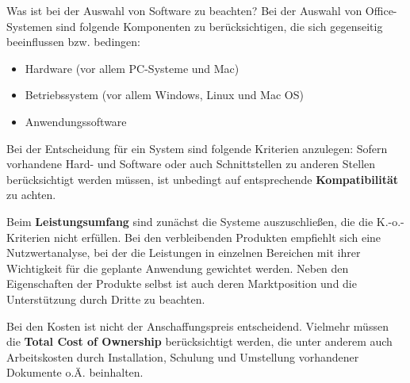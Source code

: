 \documentclass[a6paper,10pt,grid=front%
,toc
]{kartei}
\begin{document}
  \begin{karte}{Was ist bei der Auswahl von Software zu beachten?}  
    Bei der Auswahl von Office-Systemen sind folgende Komponenten zu berücksichtigen, die sich gegenseitig beeinflussen bzw. bedingen:

    \begin{itemize}
      \item Hardware (vor allem PC-Systeme und Mac)
      \item Betriebssystem (vor allem Windows, Linux und Mac OS)
      \item Anwendungssoftware
    \end{itemize}

    Bei der Entscheidung für ein System sind folgende Kriterien anzulegen: Sofern vorhandene Hard- und Software oder auch Schnittstellen zu anderen Stellen berücksichtigt werden müssen, ist unbedingt auf entsprechende \textbf{Kompatibilität} zu achten.

    Beim \textbf{Leistungsumfang} sind zunächst die Systeme auszuschließen, die die K.-o.-Kriterien nicht erfüllen. Bei den verbleibenden Produkten empfiehlt sich eine Nutzwertanalyse, bei der die Leistungen in einzelnen Bereichen mit ihrer Wichtigkeit für die geplante Anwendung gewichtet werden. Neben den Eigenschaften der Produkte selbst ist auch deren Marktposition und die Unterstützung durch Dritte zu beachten.

    Bei den Kosten ist nicht der Anschaffungspreis entscheidend. Vielmehr müssen die \textbf{Total Cost of Ownership} berücksichtigt werden, die unter anderem auch Arbeitskosten durch Installation, Schulung und Umstellung vorhandener Dokumente o.Ä. beinhalten.
  \end{karte}
\end{document}
